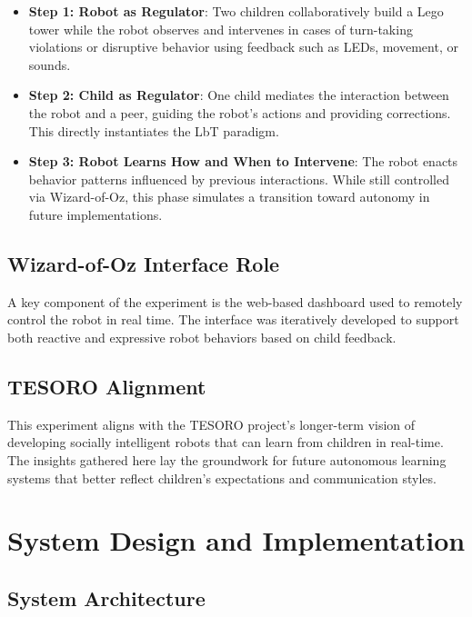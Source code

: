 \documentclass[a4paper]{usiinfbachelorproject}
\begin{document}
\begin{itemize}
    \item \textbf{Step 1: Robot as Regulator}: Two children collaboratively build a Lego tower while the robot observes and intervenes in cases of turn-taking violations or disruptive behavior using feedback such as LEDs, movement, or sounds.
    \item \textbf{Step 2: Child as Regulator}: One child mediates the interaction between the robot and a peer, guiding the robot's actions and providing corrections. This directly instantiates the LbT paradigm.
    \item \textbf{Step 3: Robot Learns How and When to Intervene}: The robot enacts behavior patterns influenced by previous interactions. While still controlled via Wizard-of-Oz, this phase simulates a transition toward autonomy in future implementations.
\end{itemize}

\subsection*{\textbf{Wizard-of-Oz Interface Role}}
A key component of the experiment is the web-based dashboard used to remotely control the robot in real time.
The interface was iteratively developed to support both reactive and expressive robot behaviors based on child feedback.

\subsection*{\textbf{TESORO Alignment}}
This experiment aligns with the TESORO project's longer-term vision of developing socially intelligent robots that can learn from children in real-time.
The insights gathered here lay the groundwork for future autonomous learning systems that better reflect children's expectations and communication styles.

\section{\textbf{System Design and Implementation}}\label{sec:system}

\subsection{\textbf{System Architecture}}
\end{document}
